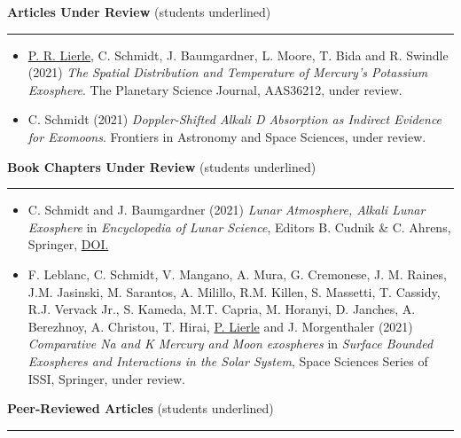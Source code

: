 \documentclass[12pt]{report}
\begin{document}
\vspace{2 mm}
\noindent\textbf{Articles Under Review} (students underlined) \rm\hspace*{\fill} \\
\rule{\textwidth}{1pt}
\begin{itemize} \itemsep -2pt %
  \item \underline{P. R. Lierle}, C. Schmidt, J. Baumgardner, L. Moore, T. Bida and R. Swindle (2021) \textit{The Spatial Distribution and Temperature of Mercury’s Potassium Exosphere}. The Planetary Science Journal, AAS36212, under review.
  \item C. Schmidt (2021) \textit{Doppler-Shifted Alkali D Absorption as Indirect Evidence for Exomoons}. Frontiers in Astronomy and Space Sciences, under review.
 \end{itemize}
\vspace{2 mm}
\noindent\textbf{Book Chapters Under Review} (students underlined) \rm\hspace*{\fill} \\
\rule{\textwidth}{1pt}
\begin{itemize} \itemsep -2pt %
  \item C. Schmidt and J. Baumgardner (2021) \textit{Lunar Atmosphere, Alkali Lunar Exosphere} in \textit{Encyclopedia of Lunar Science}, Editors B. Cudnik \& C. Ahrens, Springer, \href{https://doi.org/10.1007/978-3-319-05546-6}{DOI.}
  \item F. Leblanc, C. Schmidt, V. Mangano, A. Mura, G. Cremonese, J. M. Raines, J.M. Jasinski, M. Sarantos, A. Milillo, R.M. Killen, S. Massetti, T. Cassidy, R.J. Vervack Jr., S. Kameda, M.T. Capria, M. Horanyi, D. Janches, A. Berezhnoy, A. Christou, T. Hirai, \underline{P. Lierle} and J. Morgenthaler (2021) \textit{Comparative Na and K Mercury and Moon exospheres} in \textit{Surface Bounded Exospheres and Interactions in the Solar System}, Space Sciences Series of ISSI, Springer, under review.
 \end{itemize}
\vspace{2 mm}
\noindent\textbf{Peer-Reviewed Articles} (students underlined) \rm\hspace*{\fill} \\
\rule{\textwidth}{1pt}
\end{document}

